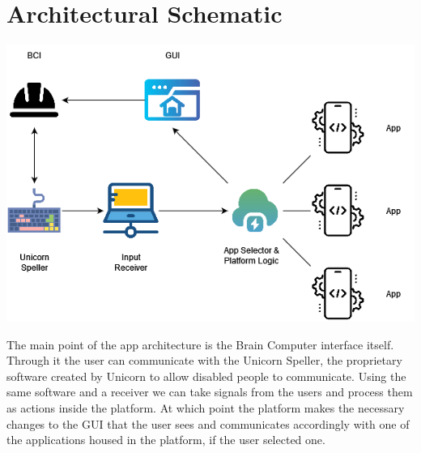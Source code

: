 \section{Architectural Schematic}\label{sect:architectural schematic}
\vspace{20pt}
\includegraphics[width = 420pt]{Diagrams/Architectural.png}

\vspace{5pt}
\vspace{25pt}

\hspace{\parindent} The main point of the app architecture is the Brain Computer interface itself. Through it the user can communicate with the Unicorn Speller, the proprietary software created by Unicorn to allow disabled people to communicate. Using the same software and a receiver we can take signals from the users and process them as actions inside the platform. At which point the platform makes the necessary changes to the GUI that the user sees and communicates accordingly with one of the applications housed in the platform, if the user selected one.